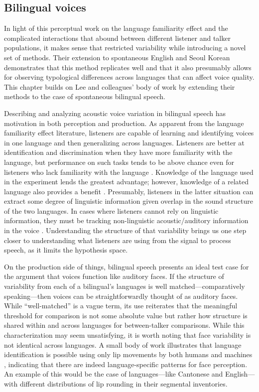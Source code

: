 \subsection{Bilingual voices}\label{ch3:sec:clxcomparisons}

In light of this perceptual work on the language familiarity effect and the complicated interactions that abound between different listener and talker populations, it makes sense that \citet{lee_2019_acoustic} restricted variability while introducing a novel set of methods. Their extension to spontaneous English and Seoul Korean demonstrates that this method replicates well and that it also presumably allows for observing typological differences across languages that can affect voice quality. This chapter builds on Lee and colleagues' body of work by extending their methods to the case of spontaneous bilingual speech. 

Describing and analyzing acoustic voice variation in bilingual speech has motivation in both perception and production. As apparent from the language familiarity effect literature, listeners are capable of learning and identifying voices in one language and then generalizing across languages. Listeners are better at identification and discrimination when they have more familiarity with the language, but performance on such tasks tends to be above chance even for listeners who lack familiarity with the language \citep[e.g.,][]{orena_2019_identifying}. Knowledge of the language used in the experiment lends the greatest advantage; however, knowledge of a related language also provides a benefit \citep{zarate_2015_multiple}. Presumably, listeners in the latter situation can extract some degree of linguistic information given overlap in the sound structure of the two languages. In cases where listeners cannot rely on linguistic information, they must be tracking non-linguistic acoustic/auditory information in the voice \citep{perrachione_2019_judgments}. Understanding the structure of that variability brings us one step closer to understanding what listeners are using from the signal to process speech, as it limits the hypothesis space. 

On the production side of things, bilingual speech presents an ideal test case for the argument that voices function like auditory faces. If the structure of variability from each of a bilingual's languages is well matched---comparatively speaking---then voices can be straightforwardly thought of as auditory faces. While ``well-matched'' is a vague term, its use reiterates that the meaningful threshold for comparison is not some absolute value but rather how structure is shared within and across languages for between-talker comparisons. While this characterization may seem unsatisfying, it is worth noting that face variability is not identical across languages. A small body of work illustrates that language identification is possible using only lip movements by both humans \citep{sotofaraco_2007_discriminating} and machines \citep{afouras_2020_now}, indicating that there are indeed language-specific patterns for face perception. An example of this would be the case of languages---like Cantonese and English---with different distributions of lip rounding in their segmental inventories. 

